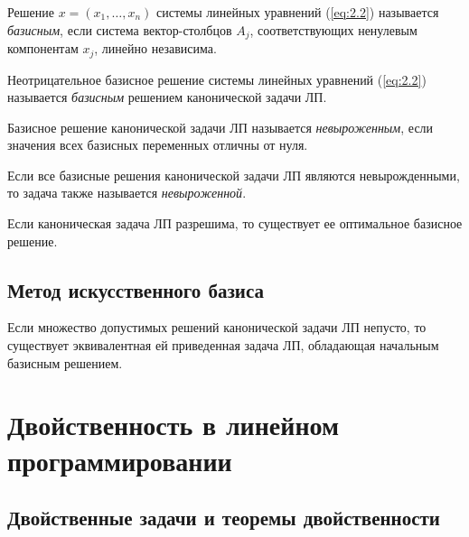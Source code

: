 \begin{definition}
  Решение $ x = (x_1,\ldots,x_n) $ системы линейных уравнений (\ref{eq:2.2}) называется \emph{базисным}, если система вектор-столбцов $ A_j $, соответствующих ненулевым компонентам $ x_j $, линейно независима.
\end{definition}

\begin{definition}
  Неотрицательное базисное решение системы линейных уравнений (\ref{eq:2.2}) называется \emph{базисным} решением канонической задачи ЛП.
\end{definition}

\begin{definition}
  Базисное решение канонической задачи ЛП называется \emph{невыроженным}, если значения всех базисных переменных отличны от нуля.

    Если все базисные решения канонической задачи ЛП являются невырожденными, то задача также называется \emph{невыроженной}.
\end{definition}

\begin{theorem}
  Если каноническая задача ЛП разрешима, то существует ее оптимальное базисное решение.
\end{theorem}

\subsection{Метод искусственного базиса}

\begin{theorem}
  Если множество допустимых решений канонической задачи ЛП непусто, то существует эквивалентная ей приведенная задача ЛП, обладающая начальным базисным решением.
\end{theorem}

\section{Двойственность в линейном программировании}

\subsection{Двойственные задачи и теоремы двойственности}

